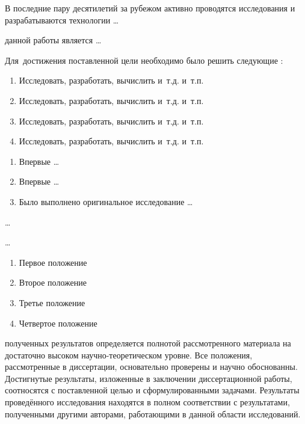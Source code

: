 {\progress} В последние пару десятилетий за рубежом активно проводятся исследования и разрабатываются технологии \ldots

{\aim} данной работы является \ldots

Для~достижения поставленной цели необходимо было решить следующие {\tasks}:
\begin{enumerate}[beginpenalty=10000] %
  \item Исследовать, разработать, вычислить и~т.\:д. и~т.\:п.
  \item Исследовать, разработать, вычислить и~т.\:д. и~т.\:п.
  \item Исследовать, разработать, вычислить и~т.\:д. и~т.\:п.
  \item Исследовать, разработать, вычислить и~т.\:д. и~т.\:п.
\end{enumerate}


{\novelty}
\begin{enumerate}[beginpenalty=10000] %
  \item Впервые \ldots
  \item Впервые \ldots
  \item Было выполнено оригинальное исследование \ldots
\end{enumerate}

{\influence} \ldots

{\methods} \ldots

{}
\begin{enumerate}[beginpenalty=10000] %
  \item Первое положение
  \item Второе положение
  \item Третье положение
  \item Четвертое положение
\end{enumerate}

{\reliability} полученных результатов определяется полнотой рассмотренного материала на достаточно высоком научно-теоретическом уровне. Все положения,  рассмотренные в диссертации, основательно проверены и научно обоснованны. Достигнутые результаты, изложенные в заключении диссертационной работы, соотносятся с поставленной целью и сформулированными задачами. Результаты проведённого исследования находятся в полном соответствии с результатами, полученными другими авторами, работающими в данной области исследований.


